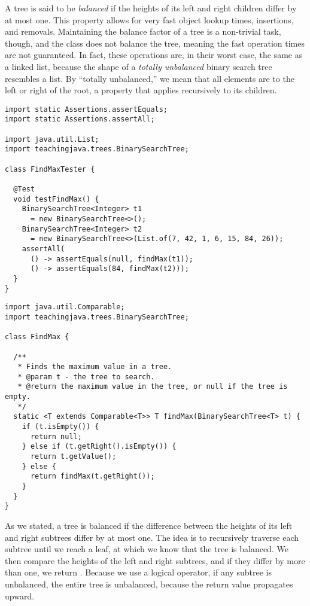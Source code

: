 A tree is said to be \emph{balanced} if the heights of its left and right children differ by at most one.
This property allows for very fast object lookup times, insertions, and removals. 
Maintaining the balance factor of a tree is a non-trivial task, though, and the  class does not balance the tree, meaning the fast operation times are not guaranteed.
In fact, these operations are, in their worst case, the same as a linked list, because the shape of a \emph{totally unbalanced} binary search tree resembles a list. 
By ``totally unbalanced,'' we mean that all elements are to the left or right of the root, a property that applies recursively to its children.


\begin{lstlisting}[language=MyJava]
import static Assertions.assertEquals;
import static Assertions.assertAll;

import java.util.List;
import teachingjava.trees.BinarySearchTree;

class FindMaxTester {

  @Test
  void testFindMax() {
    BinarySearchTree<Integer> t1 
      = new BinarySearchTree<>();
    BinarySearchTree<Integer> t2 
      = new BinarySearchTree<>(List.of(7, 42, 1, 6, 15, 84, 26));
    assertAll(
      () -> assertEquals(null, findMax(t1));
      () -> assertEquals(84, findMax(t2)));
  }
}
\end{lstlisting}

\enlargethispage{1\baselineskip}
\begin{lstlisting}[language=MyJava]
import java.util.Comparable;
import teachingjava.trees.BinarySearchTree;

class FindMax {

  /**
   * Finds the maximum value in a tree.
   * @param t - the tree to search.
   * @return the maximum value in the tree, or null if the tree is empty.
   */
  static <T extends Comparable<T>> T findMax(BinarySearchTree<T> t) {
    if (t.isEmpty()) {
      return null;
    } else if (t.getRight().isEmpty()) {
      return t.getValue();
    } else {
      return findMax(t.getRight());
    }
  }
}
\end{lstlisting}

 As we stated, a tree is balanced if the difference between the heights of its left and right subtrees differ by at most one. The idea is to recursively traverse each subtree until we reach a leaf, at which we know that the tree is balanced. We then compare the heights of the left and right subtrees, and if they differ by more than one, we return . Because we use a logical  operator, if any subtree is unbalanced, the entire tree is unbalanced, because the  return value propagates upward.


